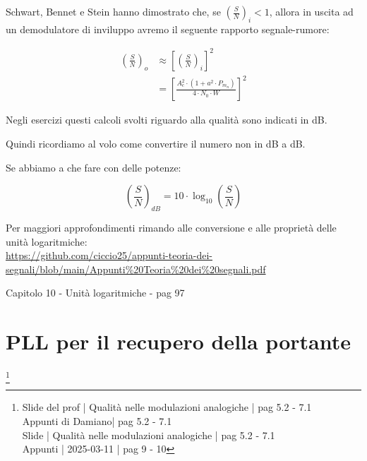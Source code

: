 Schwart, Bennet e Stein hanno dimostrato che, se $\left(\frac{S}{N} \right)_{i} < 1$, 
allora in uscita ad un demodulatore di inviluppo avremo il seguente rapporto segnale-rumore:

{
    \Large 
    \begin{equation}
        \begin{split}
            \left( \frac{S}{N}\right)_{o}
            & \approx
            \left[\left(\frac{S}{N}\right)_{i}\right]^{2}
            \\
            &=
            \left[\frac{A_c ^{2} \cdot \left( 1 + a^{2} \cdot P_{m_n}\right)}{4 \cdot N_0 \cdot W}\right]^{2}
        \end{split}
    \end{equation}
}

\begin{tcolorbox}
Negli esercizi questi calcoli svolti riguardo alla qualità sono indicati in dB. \newline 

Quindi ricordiamo al volo come convertire il numero non in dB a dB. \newline 

Se abbiamo a che fare con delle potenze: 

\begin{equation}
    \left( \frac{S}{N}\right)_{dB} = 10 \cdot \log_{10} \left( \frac{S}{N}\right)
\end{equation}

Per maggiori approfondimenti rimando alle conversione e alle proprietà delle unità logaritmiche: \\
\url{https://github.com/ciccio25/appunti-teoria-dei-segnali/blob/main/Appunti%20Teoria%20dei%20segnali.pdf} \newline

Capitolo 10 - Unità logaritmiche - pag 97
\end{tcolorbox}

\newpage 

\section{PLL per il recupero della portante}
\footnote{Slide del prof | Qualità nelle modulazioni analogiche | pag 5.2 - 7.1\\  
Appunti di Damiano| pag 5.2 - 7.1\\
Slide | Qualità nelle modulazioni analogiche | pag 5.2 - 7.1 \\
Appunti | 2025-03-11 | pag 9 - 10
} 

